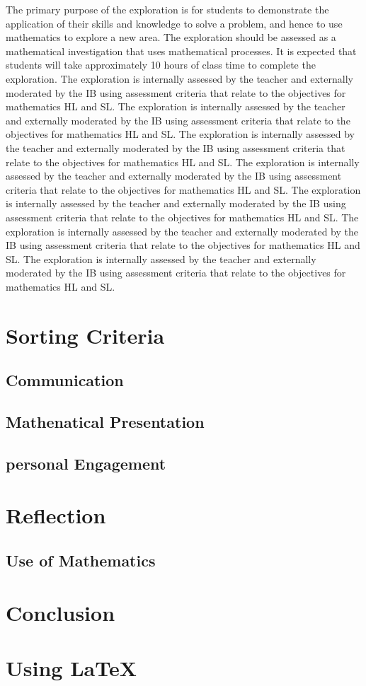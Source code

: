 \documentclass[11pt]{article}
\begin{document}
The primary purpose of the exploration is for students to demonstrate the application of their skills and knowledge to solve a problem, and hence to use mathematics to explore a new area. The exploration should be assessed as a mathematical investigation that uses mathematical processes. It is expected that students will take approximately 10 hours of class time to complete the exploration. The exploration is internally assessed by the teacher and externally moderated by the IB using assessment criteria that relate to the objectives for mathematics HL and SL. The exploration is internally assessed by the teacher and externally moderated by the IB using assessment criteria that relate to the objectives for mathematics HL and SL. The exploration is internally assessed by the teacher and externally moderated by the IB using assessment criteria that relate to the objectives for mathematics HL and SL. The exploration is internally assessed by the teacher and externally moderated by the IB using assessment criteria that relate to the objectives for mathematics HL and SL. The exploration is internally assessed by the teacher and externally moderated by the IB using assessment criteria that relate to the objectives for mathematics HL and SL. The exploration is internally assessed by the teacher and externally moderated by the IB using assessment criteria that relate to the objectives for mathematics HL and SL. The exploration is internally assessed by the teacher and externally moderated by the IB using assessment criteria that relate to the objectives for mathematics HL and SL. 
\section{Sorting Criteria}

\subsection{Communication}


\subsection{Mathenatical Presentation}

\subsection{personal Engagement}

\section{Reflection}

\subsection{Use of Mathematics}

\section{Conclusion}

\section{Using \LaTeX}
\end{document}
